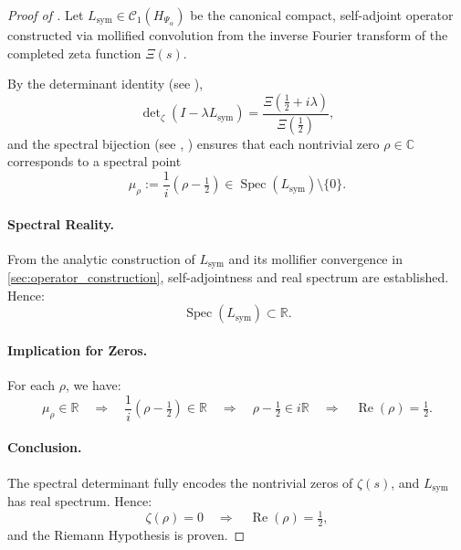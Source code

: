 \begin{proof}[Proof of ]
Let \( L_{\mathrm{sym}} \in \mathcal{C}_1(H_{\Psi_\alpha}) \) be the canonical compact, self-adjoint operator constructed via mollified convolution from the inverse Fourier transform of the completed zeta function \( \Xi(s) \).

By the determinant identity (see ),
\[
\det\nolimits_\zeta(I - \lambda L_{\mathrm{sym}}) = \frac{\Xi\left( \tfrac{1}{2} + i\lambda \right)}{\Xi\left( \tfrac{1}{2} \right)},
\]
and the spectral bijection (see , ) ensures that each nontrivial zero \( \rho \in \mathbb{C} \) corresponds to a spectral point
\[
\mu_\rho := \frac{1}{i}(\rho - \tfrac{1}{2}) \in \operatorname{Spec}(L_{\mathrm{sym}}) \setminus \{0\}.
\]

\paragraph{Spectral Reality.}
From the analytic construction of \( L_{\mathrm{sym}} \) and its mollifier convergence in \cref{sec:operator_construction}, self-adjointness and real spectrum are established. Hence:
\[
\operatorname{Spec}(L_{\mathrm{sym}}) \subset \mathbb{R}.
\]

\paragraph{Implication for Zeros.}
For each \( \rho \), we have:
\[
\mu_\rho \in \mathbb{R} \quad \Rightarrow \quad \frac{1}{i}(\rho - \tfrac{1}{2}) \in \mathbb{R}
\quad \Rightarrow \quad \rho - \tfrac{1}{2} \in i\mathbb{R}
\quad \Rightarrow \quad \operatorname{Re}(\rho) = \tfrac{1}{2}.
\]

\paragraph{Conclusion.}
The spectral determinant fully encodes the nontrivial zeros of \( \zeta(s) \), and \( L_{\mathrm{sym}} \) has real spectrum. Hence:
\[
\zeta(\rho) = 0 \quad \Longrightarrow \quad \operatorname{Re}(\rho) = \tfrac{1}{2},
\]
and the Riemann Hypothesis is proven.
\end{proof}
